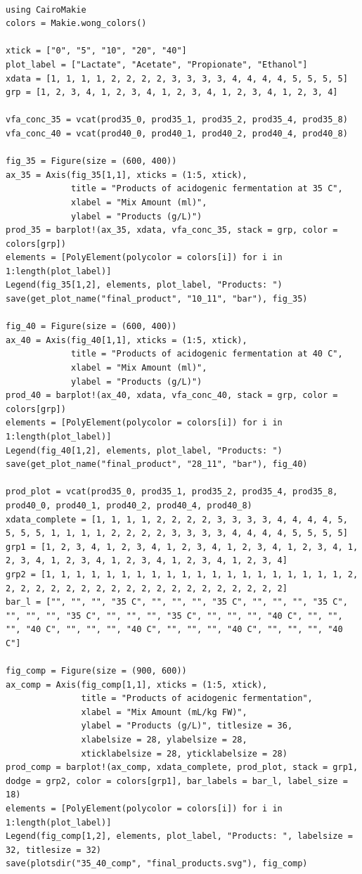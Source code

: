 \documentclass[11pt]{article}
\begin{document}
\begin{verbatim}

using CairoMakie
colors = Makie.wong_colors()

xtick = ["0", "5", "10", "20", "40"]
plot_label = ["Lactate", "Acetate", "Propionate", "Ethanol"]
xdata = [1, 1, 1, 1, 2, 2, 2, 2, 3, 3, 3, 3, 4, 4, 4, 4, 5, 5, 5, 5]
grp = [1, 2, 3, 4, 1, 2, 3, 4, 1, 2, 3, 4, 1, 2, 3, 4, 1, 2, 3, 4]

vfa_conc_35 = vcat(prod35_0, prod35_1, prod35_2, prod35_4, prod35_8)
vfa_conc_40 = vcat(prod40_0, prod40_1, prod40_2, prod40_4, prod40_8)

fig_35 = Figure(size = (600, 400))
ax_35 = Axis(fig_35[1,1], xticks = (1:5, xtick),
             title = "Products of acidogenic fermentation at 35 C",
             xlabel = "Mix Amount (ml)",
             ylabel = "Products (g/L)")
prod_35 = barplot!(ax_35, xdata, vfa_conc_35, stack = grp, color = colors[grp])
elements = [PolyElement(polycolor = colors[i]) for i in 1:length(plot_label)]
Legend(fig_35[1,2], elements, plot_label, "Products: ")
save(get_plot_name("final_product", "10_11", "bar"), fig_35)

fig_40 = Figure(size = (600, 400))
ax_40 = Axis(fig_40[1,1], xticks = (1:5, xtick),
             title = "Products of acidogenic fermentation at 40 C",
             xlabel = "Mix Amount (ml)",
             ylabel = "Products (g/L)")
prod_40 = barplot!(ax_40, xdata, vfa_conc_40, stack = grp, color = colors[grp])
elements = [PolyElement(polycolor = colors[i]) for i in 1:length(plot_label)]
Legend(fig_40[1,2], elements, plot_label, "Products: ")
save(get_plot_name("final_product", "28_11", "bar"), fig_40)

prod_plot = vcat(prod35_0, prod35_1, prod35_2, prod35_4, prod35_8, prod40_0, prod40_1, prod40_2, prod40_4, prod40_8)
xdata_complete = [1, 1, 1, 1, 2, 2, 2, 2, 3, 3, 3, 3, 4, 4, 4, 4, 5, 5, 5, 5, 1, 1, 1, 1, 2, 2, 2, 2, 3, 3, 3, 3, 4, 4, 4, 4, 5, 5, 5, 5]
grp1 = [1, 2, 3, 4, 1, 2, 3, 4, 1, 2, 3, 4, 1, 2, 3, 4, 1, 2, 3, 4, 1, 2, 3, 4, 1, 2, 3, 4, 1, 2, 3, 4, 1, 2, 3, 4, 1, 2, 3, 4]
grp2 = [1, 1, 1, 1, 1, 1, 1, 1, 1, 1, 1, 1, 1, 1, 1, 1, 1, 1, 1, 1, 2, 2, 2, 2, 2, 2, 2, 2, 2, 2, 2, 2, 2, 2, 2, 2, 2, 2, 2, 2]
bar_l = ["", "", "", "35 C", "", "", "", "35 C", "", "", "", "35 C", "", "", "", "35 C", "", "", "", "35 C", "", "", "", "40 C", "", "", "", "40 C", "", "", "", "40 C", "", "", "", "40 C", "", "", "", "40 C"]

fig_comp = Figure(size = (900, 600))
ax_comp = Axis(fig_comp[1,1], xticks = (1:5, xtick),
               title = "Products of acidogenic fermentation",
               xlabel = "Mix Amount (mL/kg FW)",
               ylabel = "Products (g/L)", titlesize = 36,
               xlabelsize = 28, ylabelsize = 28,
               xticklabelsize = 28, yticklabelsize = 28)
prod_comp = barplot!(ax_comp, xdata_complete, prod_plot, stack = grp1, dodge = grp2, color = colors[grp1], bar_labels = bar_l, label_size = 18)
elements = [PolyElement(polycolor = colors[i]) for i in 1:length(plot_label)]
Legend(fig_comp[1,2], elements, plot_label, "Products: ", labelsize = 32, titlesize = 32)
save(plotsdir("35_40_comp", "final_products.svg"), fig_comp)
\end{verbatim}
\end{document}
